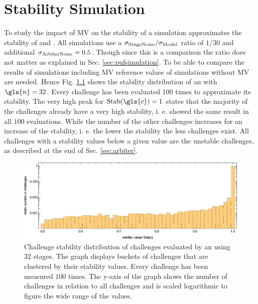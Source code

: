 \chapter{Stability Simulation}
\label{cap:stabilitysimulation}

To study the impact of \ac{MV} on the stability of \apufs a simulation approximates the stability of \mpufs and \mxpufs.
All simulations use a $\sigma_{\mathrm{Stage Noise}}/\sigma_{\mathrm{Model}}$ ratio of $1/30$ and additional $\sigma_{\mathrm{Arbiter Noise}} = 0.5$.
Though since this is a comparison the ratio does not matter as explained in Sec. \ref{sec:pufsimulation}.
To be able to compare the results of simulations including \ac{MV} reference values of \apufs simulations without \ac{MV} are needed.
Hence Fig. \ref{fig:arbiterstabilitydistribution} shows the stability distribution of an \apuf with $\gls{n} = 32$.
Every challenge has been evaluated $100$ times to approximate its stability.
The very high peak for $\Stab(\gls{c}) = 1$ states that the majority of the challenges already have a very high stability, i. e. showed the same result in all $100$ evaluations.
While the number of the other challenges increases for an increase of the stability, i. e. the lower the stability the less challenges exist.
All challenges with a stability values below a given value are the unstable challenges, as described at the end of Sec. \ref{sec:arbiter}.

\begin{figure}[ht]
\includegraphics[width=1.00\textwidth]{images/arbiter-stability-distribution-simulation.eps}
\caption[Challenge stability distribution of an \apuf]{Challenge stability distribution of challenges evaluated by an \apuf using $32$ stages. 
The graph displays buckets of challenges that are clustered by their stability values.
Every challenge has been measured $100$ times. The y-axis of the graph shows the number of challenges in relation to all challenges and is scaled logarithmic to figure the wide range of the values.}  %
\label{fig:arbiterstabilitydistribution}
\end{figure}

